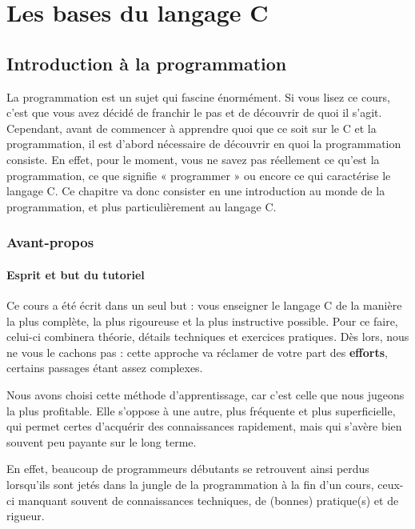 \part{Les bases du langage C}
\label{les-bases-du-langage-C}

\chapter{Introduction à la programmation}
\label{introduction-a-la-programmation}

La programmation est un sujet qui fascine énormément. Si vous lisez ce
cours, c’est que vous avez décidé de franchir le pas et de découvrir
de quoi il s’agit.  Cependant, avant de commencer à apprendre quoi que
ce soit sur le C et la programmation, il est d’abord nécessaire de
découvrir en quoi la programmation consiste. En effet, pour le moment,
vous ne savez pas réellement ce qu’est la programmation, ce que
signifie « programmer » ou encore ce qui caractérise le langage C. Ce
chapitre va donc consister en une introduction au monde de la
programmation, et plus particulièrement au langage C.

\section{Avant-propos}
\label{avant-propos}

\subsection{Esprit et but du tutoriel}
\label{esprit-et-but-du-tutoriel}

Ce cours a été écrit dans un seul but : vous enseigner le langage C de
la manière la plus complète, la plus rigoureuse et la plus instructive
possible. Pour ce faire, celui-ci combinera théorie, détails
techniques et exercices pratiques. Dès lors, nous ne vous le cachons
pas : cette approche va réclamer de votre part des \textbf{efforts},
certains passages étant assez complexes.

Nous avons choisi cette méthode d'apprentissage, car c'est celle que
nous jugeons la plus profitable. Elle s'oppose à une autre, plus
fréquente et plus superficielle, qui permet certes d'acquérir des
connaissances rapidement, mais qui s'avère bien souvent peu payante
sur le long terme.

En effet, beaucoup de programmeurs débutants se retrouvent ainsi
perdus lorsqu'ils sont jetés dans la jungle de la programmation à la
fin d'un cours, ceux-ci manquant souvent de connaissances techniques,
de (bonnes) pratique(s) et de rigueur.

